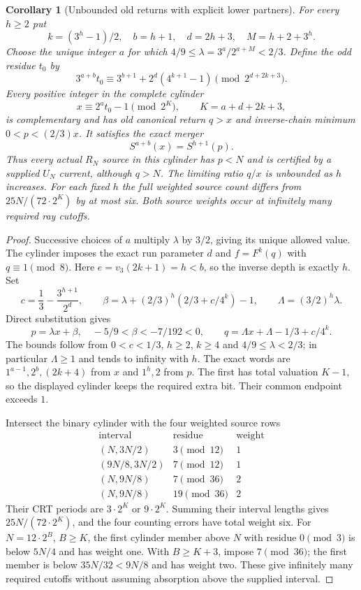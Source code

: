 \documentclass[11pt]{article}
\newtheorem{corollary}[theorem]{Corollary}
\begin{document}
\begin{corollary}[Unbounded old returns with explicit lower partners]
\label{cor:inversefamilies}
For every $h\ge2$ put
\[
k=(3^h-1)/2,\quad b=h+1,\quad d=2h+3,\quad M=h+2+3^h.
\]
Choose the unique integer $a$ for which
$4/9\le\lambda=3^a/2^{a+M}<2/3$. Define the odd residue $t_0$ by
\[
3^{a+b}t_0\equiv3^{b+1}+2^d(4^{k+1}-1)
\pmod{2^{d+2k+3}}.
\]
Every positive integer in the complete cylinder
\[
x\equiv2^at_0-1\pmod{2^K},\qquad K=a+d+2k+3,
\]
is complementary and has old canonical return $q>x$ and inverse-chain
minimum $0<p<(2/3)x$. It satisfies the exact merger
\[
S^{a+b}(x)=S^{h+1}(p).
\]
Thus every actual $R_N$ source in this cylinder has $p<N$ and is
certified by a supplied $U_N$ current, although $q>N$.
The limiting ratio $q/x$ is unbounded as $h$ increases. For each fixed
$h$ the full weighted source count differs from
$25N/(72\cdot2^K)$ by at most six. Both source weights occur at
infinitely many required ray cutoffs.
\end{corollary}
\begin{proof}
Successive choices of $a$ multiply $\lambda$ by $3/2$, giving its
unique allowed value. The cylinder imposes the exact run parameter
$d$ and $f=F^k(q)$ with $q\equiv1\pmod8$.
Here $e=v_3(2k+1)=h<b$, so the inverse depth is exactly $h$.
Set
\[
c=\frac13-\frac{3^{h+1}}{2^d},\qquad
\beta=\lambda+(2/3)^h(2/3+c/4^k)-1,
\qquad \Lambda=(3/2)^h\lambda.
\]
Direct substitution gives
\[
p=\lambda x+\beta,\quad -5/9<\beta<-7/192<0,
\qquad q=\Lambda x+\Lambda-1/3+c/4^k.
\]
The bounds follow from $0<c<1/3$, $h\ge2$, $k\ge4$ and
$4/9\le\lambda<2/3$; in particular $\Lambda\ge1$ and tends to
infinity with $h$. The exact words are
$1^{a-1},2^b,(2k+4)$ from $x$ and $1^h,2$ from $p$.
The first has total valuation $K-1$, so the displayed cylinder keeps
the required extra bit. Their common endpoint exceeds $1$.

Intersect the binary cylinder with the four weighted source rows
\[
\begin{array}{c|c|c}
\text{interval}&\text{residue}&\text{weight}\\\hline
(N,3N/2)&3\pmod{12}&1\\
(9N/8,3N/2)&7\pmod{12}&1\\
(N,9N/8)&7\pmod{36}&2\\
(N,9N/8)&19\pmod{36}&2
\end{array}
\]
Their CRT periods are $3\cdot2^K$ or $9\cdot2^K$. Summing their
interval lengths gives $25N/(72\cdot2^K)$, and the four counting
errors have total weight six. For $N=12\cdot2^B$, $B\ge K$, the
first cylinder member above $N$ with residue $0\pmod3$ is below
$5N/4$ and has weight one. With $B\ge K+3$, impose $7\pmod{36}$;
the first member is below $35N/32<9N/8$ and has weight two.
These give infinitely many required cutoffs without assuming absorption
above the supplied interval.
\end{proof}
\end{document}
